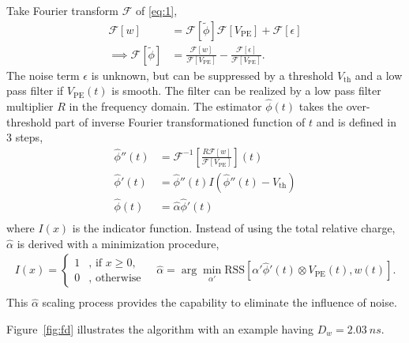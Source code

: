Take Fourier transform $\mathcal{F}$ of \eqref{eq:1},
\begin{equation}
  \label{eq:fourier}
  \begin{aligned}
  \mathcal{F}[w] & = \mathcal{F}[\tilde{\phi}]\mathcal{F}[V_\mathrm{PE}] + \mathcal{F}[\epsilon]\\
  \implies \mathcal{F}[\tilde{\phi}] & = \frac{\mathcal{F}[w]}{\mathcal{F}[V_\mathrm{PE}]} - \frac{\mathcal{F}[\epsilon]}{\mathcal{F}[V_\mathrm{PE}]}.
  \end{aligned}
\end{equation}
The noise term $\epsilon$ is unknown, but can be suppressed by a threshold $V_\mathrm{th}$ and a low pass filter if $V_\mathrm{PE}(t)$ is smooth.  The filter can be realized by a low pass filter multiplier $R$ in the frequency domain. The estimator $\hat{\phi}(t)$ takes the over-threshold part of inverse Fourier transformationed function of $t$ and is defined in 3 steps,
\begin{equation}
  \label{eq:fdconv2}
  \begin{aligned}
    \hat{\phi}''(t) & = \mathcal{F}^{-1}\left[\frac{R \mathcal{F}[w]}{\mathcal{F}[V_\mathrm{PE}]}\right](t) \\
    \hat{\phi}'(t) & = \hat{\phi}''(t) I(\hat{\phi}''(t) - V_\mathrm{th}) \\
    \hat{\phi}(t) & = \hat{\alpha}\hat{\phi}'(t) \\
  \end{aligned}
\end{equation}
where $I(x)$ is the indicator function. Instead of using the total relative charge, $\hat{\alpha}$ is derived with a minimization procedure, 
\begin{equation}
  \begin{aligned}
  \label{eq:id}
  I(x) = \left\{
    \begin{array}{ll}
      1 & \mbox{, if $x\ge0$}, \\
      0 & \mbox{, otherwise}
    \end{array}
    \right.
    \quad
    \hat{\alpha} = \arg \underset{\alpha'}{\min}\mathrm{RSS}\left[\alpha'\hat{\phi}'(t)\otimes V_\mathrm{PE}(t),w(t)\right]. \\
  \end{aligned}
\end{equation}
This $\hat{\alpha}$ scaling process provides the capability to eliminate the influence of noise. 

Figure~\ref{fig:fd} illustrates the algorithm with an example having $D_w = \SI{2.03}{ns}$. 

